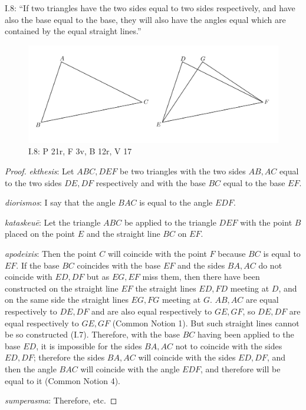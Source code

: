 \documentclass{article}
\begin{document}
I.8: ``If two triangles have the two sides equal to two sides
respectively, and have also the base equal to the base, they will
also have the angles equal which are contained by the equal
straight lines.''

\begin{figure}
\begin{center}
\includegraphics[width=\textwidth]{I8.png}
\end{center}
\caption{I.8: P 21r, F 3v, B 12r, V 17}
\label{I8}
\end{figure}

\begin{proof}
{\em ekthesis}: Let $ABC,DEF$ be two triangles with the two sides $AB,AC$ equal to the two sides $DE,DF$ respectively
and with the base $BC$ equal to the base $EF$. 

{\em diorismos}: I say that the angle $BAC$ is equal to the angle $EDF$.

{\em kataskeu\={e}}: Let the triangle $ABC$ be applied to the triangle $DEF$ with the point $B$ placed on the point $E$
and the straight line $BC$ on $EF$.

{\em apodeixis}: Then the point $C$ will coincide with the point $F$ because
$BC$ is equal to $EF$.
If the base $BC$ coincides with the base $EF$ and the sides $BA,AC$ do not coincide with $ED,DF$ but
 as $EG,EF$ miss them, then there have been constructed on the straight line
$EF$ the straight lines $ED,FD$ meeting at $D$, and on the same side
the straight lines $EG,FG$
meeting at $G$. $AB,AC$ are equal respectively to $DE,DF$ and are also
equal respectively to $GE,GF$, so 
$DE,DF$ are equal respectively to $GE,GF$ (Common Notion 1). But such straight lines cannot be so constructed (I.7). 
Therefore, with the base $BC$ having been applied to the base $ED$, it is impossible for the sides $BA,AC$ not to coincide with the sides
$ED,DF$; therefore the sides $BA,AC$ will coincide with the sides $ED,DF$, and then
the angle $BAC$ will coincide with the angle $EDF$, and therefore will be equal to it (Common Notion 4).

{\em sumperasma}: Therefore, etc.
\end{proof}
\end{document}

